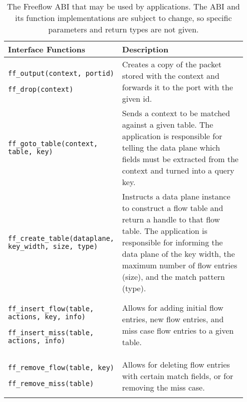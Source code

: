 \begin{table}
\caption{The Freeflow ABI that may be used by applications. The ABI and its function implementations are subject to change, so specific parameters and return types are not given.}
\begin{center}
\begin{tabular}{| p{0.4\linewidth} | p{0.55\linewidth} |}
\hline
Interface Functions & Description \\

\hline
\texttt{ff\_output(context, portid)} 

\texttt{ff\_drop(context)}
& 
Creates a copy of the packet stored with the context and forwards it to the port with the given id. \\
\hline 

\texttt{ff\_goto\_table(context, table, key)} & 
Sends a context to be matched against a given table. The application is responsible for telling the data plane which fields must be extracted from the context and turned into a query key. \\

\hline

\texttt{ff\_create\_table(dataplane, key\_width, size, type)} &
Instructs a data plane instance to construct a flow table and return a handle to that flow table. The application is responsible for informing the data plane of the key width, the maximum number of flow entries (size), and the match pattern (type). \\
\hline


\texttt{ff\_insert\_flow(table, actions, key, info)}

\texttt{ff\_insert\_miss(table, actions, info)}

&

Allows for adding initial flow entries, new flow entries, and miss case flow entries to a given table. \\
\hline

\texttt{ff\_remove\_flow(table, key)}

\texttt{ff\_remove\_miss(table)} &

Allows for deleting flow entries with certain match fields, or for removing the miss case. \\

\hline



\end{tabular}
\end{center}
\end{table}
